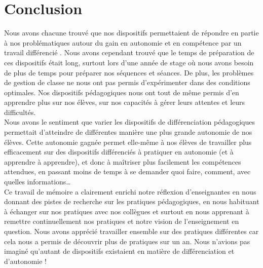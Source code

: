 \section{Conclusion}
Nous avons chacune trouvé que nos dispositifs permettaient de répondre en partie à nos problématiques autour du gain en autonomie et en compétence par un travail différencié . Nous avons cependant trouvé que le temps de préparation de ces dispositifs était long, surtout lors d'une année de stage où nous avons besoin de plus de temps pour préparer nos séquences et séances. De plus, les problèmes de gestion de classe ne nous ont pas permis d'expérimenter dans des conditions optimales. Nos dispositifs pédagogiques nous ont tout de même permis d'en apprendre plus sur nos élèves, sur nos capacités à gérer leurs attentes et leurs difficultés.\\
Nous avons le sentiment que varier les dispositifs de différenciation pédagogiques permettait d'atteindre de différentes manière une plus grande autonomie de nos élèves. Cette autonomie gagnée permet elle-même à nos élèves de travailler plus efficacement sur des dispositifs différenciés à pratiquer en autonomie (et à apprendre à apprendre), et donc à maîtriser plus facilement les compétences attendues, en passant moins de temps à se demander quoi faire, comment, avec quelles informations\ldots \\
Ce travail de mémoire a clairement enrichi notre réflexion d'enseignantes en nous donnant des pistes de recherche sur les pratiques pédagogiques, en nous habituant à échanger sur nos pratiques avec nos collègues et surtout en nous apprenant à remettre continuellement nos pratiques et notre vision de l'enseignement en question. Nous avons apprécié travailler ensemble sur des pratiques différentes car cela nous a permis de découvrir plus de pratiques sur un an. Nous n'avions pas imaginé qu'autant de dispositifs existaient en matière de différenciation et d'autonomie !

